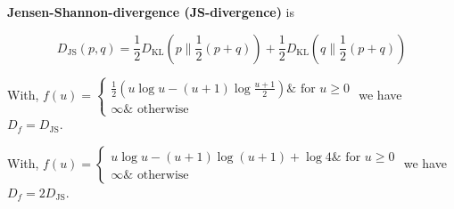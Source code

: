 \begin{definition}[12.16][JS-Divergence]
    \textbf{Jensen-Shannon-divergence (JS-divergence)} is

    $$
    D_{\mathrm{JS}}(p, q)=\frac{1}{2} D_{\mathrm{KL}}\left(p \| \frac{1}{2}(p+q)\right)+\frac{1}{2} D_{\mathrm{KL}}\left(q \| \frac{1}{2}(p+q)\right)
    $$

    With, $f(u)=\left\{\begin{array}{ll}\frac{1}{2}\left(u \log u-(u+1) \log \frac{u+1}{2}\right) \& \text { for } u \geq 0 \\ \infty \& \text { otherwise }\end{array}\right.$ we have $D_{f}=D_{\mathrm{JS}}$.

    With, $f(u)=\left\{\begin{array}{ll}u \log u-(u+1) \log (u+1)+\log 4 \& \text { for } u \geq 0 \\ \infty \& \text { otherwise }\end{array}\right.$ we have $D_{f}=2 D_{\mathrm{JS}}$.
\end{definition}

